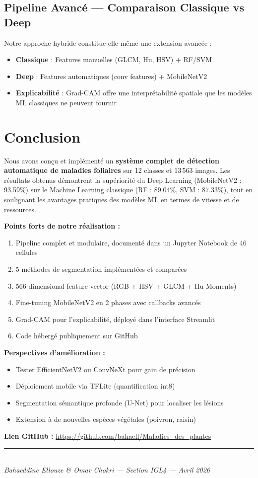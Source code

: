 \documentclass[12pt,a4paper]{article}
\begin{document}
\subsection{Pipeline Avancé — Comparaison Classique vs Deep}

Notre approche hybride constitue elle-même une extension avancée :
\begin{itemize}
  \item \textbf{Classique} : Features manuelles (GLCM, Hu, HSV) + RF/SVM
  \item \textbf{Deep} : Features automatiques (conv features) + MobileNetV2
  \item \textbf{Explicabilité} : Grad-CAM offre une interprétabilité spatiale que les modèles ML classiques ne peuvent fournir
\end{itemize}

\section{Conclusion}

Nous avons conçu et implémenté un \textbf{système complet de détection automatique 
de maladies foliaires} sur 12 classes et 13\,563 images. Les résultats obtenus 
démontrent la supériorité du Deep Learning (MobileNetV2 : 93.59\%) sur le 
Machine Learning classique (RF : 89.04\%, SVM : 87.33\%), tout en soulignant 
les avantages pratiques des modèles ML en termes de vitesse et de ressources.

\textbf{Points forts de notre réalisation :}
\begin{enumerate}
  \item Pipeline complet et modulaire, documenté dans un Jupyter Notebook de 46 cellules
  \item 5 méthodes de segmentation implémentées et comparées
  \item 566-dimensional feature vector (RGB + HSV + GLCM + Hu Moments)
  \item Fine-tuning MobileNetV2 en 2 phases avec callbacks avancés
  \item Grad-CAM pour l'explicabilité, déployé dans l'interface Streamlit
  \item Code hébergé publiquement sur GitHub
\end{enumerate}

\textbf{Perspectives d'amélioration :}
\begin{itemize}
  \item Tester EfficientNetV2 ou ConvNeXt pour gain de précision
  \item Déploiement mobile via TFLite (quantification int8)
  \item Segmentation sémantique profonde (U-Net) pour localiser les lésions
  \item Extension à de nouvelles espèces végétales (poivron, raisin)
\end{itemize}

\vspace{1cm}
\noindent\textbf{Lien GitHub :} 
\url{https://github.com/bahaell/Maladies\_des\_plantes}

\vspace{1cm}
\noindent\rule{\linewidth}{0.4pt}\\[0.2cm]
\textit{Bahaeddine Ellouze \& Omar Chokri — Section IGL4 — Avril 2026}
\end{document}
